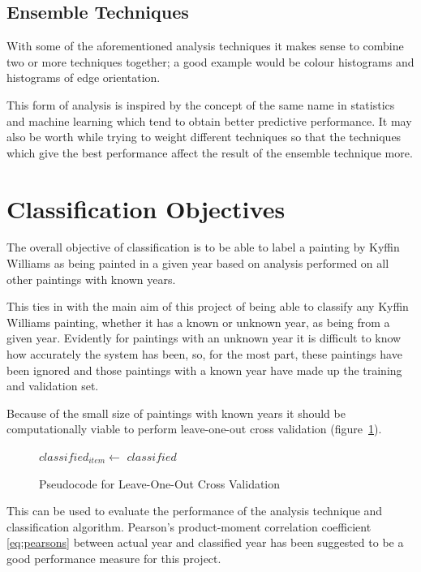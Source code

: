 \subsection{Ensemble Techniques}
With some of the aforementioned analysis techniques it makes sense to combine two or more 
techniques together; a good example would be colour histograms and histograms of edge orientation.

This form of analysis is inspired by the concept of the same name in statistics and machine 
learning which tend to obtain better predictive performance. It may also be worth while trying to
weight different techniques so that the techniques which give the best performance affect the 
result of the ensemble technique more.


\section{Classification Objectives}
The overall objective of classification is to be able to label a painting by Kyffin Williams as 
being painted in a given year based on analysis performed on all other paintings with known years.

This ties in with the main aim of this project of being able to classify any Kyffin Williams
painting, whether it has a known or unknown year, as being from a given year. Evidently for 
paintings with an unknown year it is difficult to know how accurately the system has been, so, for
the most part, these paintings have been ignored and those paintings with a known year have made
up the training and validation set.

Because of the small size of paintings with known years it should be computationally viable to 
perform leave-one-out cross validation (figure~\ref{fig:loocv}).

\begin{figure}[h]
\begin{algorithmic}
 
    \State $classified_{item} \gets$  
  \EndFor
  \Statex
  \Return $classified$
\EndFunction
\end{algorithmic}
\caption{Pseudocode for Leave-One-Out Cross Validation}\label{fig:loocv}
\end{figure}

This can be used to evaluate the performance of the analysis technique and classification 
algorithm. Pearson's product-moment correlation coefficient \eqref{eq:pearsons} between actual year
and classified year has been suggested to be a good performance measure for this project.

